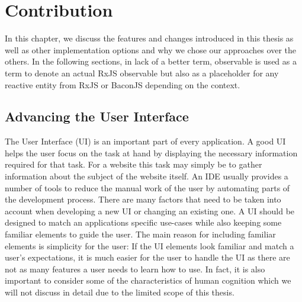 \chapter{Contribution}
\label{ch:Contribution}
In this chapter, we discuss the features and changes introduced in this thesis as well as other implementation options and why we chose our approaches over the others. In the following sections, in lack of a better term, observable is used as a term to denote an actual RxJS observable but also as a placeholder for any reactive entity from RxJS or BaconJS depending on the context.

\section{Advancing the User Interface}
The User Interface (UI) is an important part of every application. A good UI helps the user focus on the task at hand by displaying the necessary information required for that task. For a website this task may simply be to gather information about the subject of the website itself. An IDE usually provides a number of tools to reduce the manual work of the user by automating parts of the development process. There are many factors that need to be taken into account when developing a new UI or changing an existing one. A UI should be designed to match an applications specific use-cases while also keeping some familiar elements to guide the user. The main reason for including familiar elements is simplicity for the user: If the UI elements look familiar and match a user's expectations, it is much easier for the user to handle the UI as there are not as many features a user needs to learn how to use. In fact, it is also important to consider some of the characteristics of human cognition which we will not discuss in detail due to the limited scope of this thesis.
  
